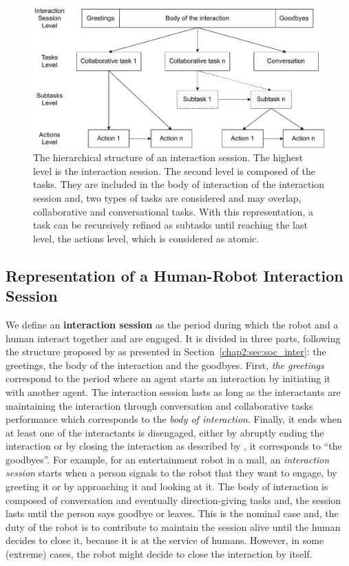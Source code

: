 \documentclass[a4paper,11pt,twoside]{StyleThese}
\begin{document}
\begin{figure}[!ht]
	\centering
	\includegraphics[width=\linewidth]{figures/chapter2/session_interaction.pdf}
	\caption{The hierarchical structure of an interaction session. The highest level is the interaction session. The second level is composed of the tasks. They are included in the body of interaction of the interaction session and, two types of tasks are considered and may overlap, collaborative and conversational tasks. With this representation, a task can be recursively refined as subtasks until reaching the last level, the actions level, which is considered as atomic.
		}
	\label{fig:levels}
\end{figure}


\subsection{Representation of a Human-Robot Interaction Session}
We define an \textbf{interaction session} as the period during which the robot and a human interact together and are engaged. It is divided in three parts, following the structure proposed by \cite{robinson_overall_2012} as presented in Section~\ref{chap2:sec:soc_inter}: the greetings, the body of the interaction and the goodbyes. First, \textit{the greetings} correspond to the period where an agent starts an interaction by initiating it with another agent. The interaction session lasts as long as the interactants are maintaining the interaction through conversation and collaborative tasks performance which corresponds to the \textit{body of interaction}. Finally, it ends when at least one of the interactants is disengaged, either by abruptly ending the interaction or by closing the interaction as described by \cite{schegloff_1973_opening}, it corresponds to ``the goodbyes''. For example, for an entertainment robot in a mall, an \textit{interaction session} starts when a person signals to the robot that they want to engage, by greeting it or by approaching it and looking at it. The body of interaction is composed of conversation and eventually direction-giving tasks and, the session lasts until the person says goodbye or leaves. This is the nominal case and, the duty of the robot is to contribute to maintain the session alive until the human decides to close it, because it is at the service of humans. However, in some (extreme) cases, the robot might decide to close the interaction by itself.
\end{document}
